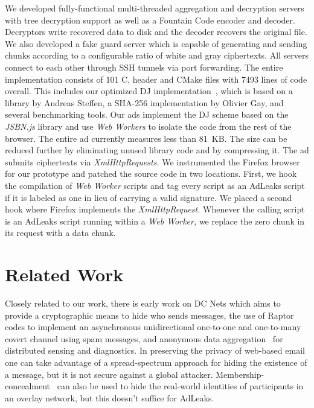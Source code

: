 \documentclass[twocolumn,10pt]{article}
\begin{document}
We developed fully-functional multi-threaded aggregation and decryption
servers with tree decryption support as well as a Fountain Code encoder and
decoder.  Decryptors write recovered data to disk and the decoder recovers
the original file.  We also developed a fake guard server which is capable
of generating and sending chunks according to a configurable ratio of white
and gray ciphertexts.  All servers connect to each other through SSH tunnels
via port forwarding.  The entire implementation consists of 101 C, header
and CMake files with 7493 lines of code overall.  This includes our
optimized DJ implementation~\cite{Jurik2003}, which is based on a library by
Andreas Steffen, a SHA-256 implementation by Olivier Gay, and several
benchmarking tools.  Our ads implement the DJ scheme based on the
\emph{JSBN.js} library and use \emph{Web Workers} to isolate the code from
the rest of the browser.  The entire ad currently measures less than 81~KB.
The size can be reduced further by eliminating unused library code and by
compressing it.  The ad submits ciphertexts via \emph{XmlHttpRequests.}  We
instrumented the Firefox browser for our prototype and patched the source
code in two locations.  First, we hook the compilation of \emph{Web Worker}
scripts and tag every script as an AdLeaks script if it is labeled as one in
lieu of carrying a valid signature.  We placed a second hook where Firefox
implements the \emph{XmlHttpRequest.}  Whenever the calling script is an
AdLeaks script running within a \emph{Web Worker,} we replace the zero chunk
in its request with a data chunk.


\section{Related Work}



Closely related to our work, there is early work on DC Nets
\cite{Chaum1988,WaidnerP1989} which aims to provide a cryptographic means to
hide who sends messages, the use of Raptor codes \cite{CastiglioneDFP2012}
to implement an asynchronous unidirectional one-to-one and one-to-many
covert channel using spam messages, and anonymous data
aggregation~\cite{PuttaswamyBP2010} for distributed sensing and
diagnostics. In preserving the privacy of web-based
email~\cite{ButlerEPTM2006} one can take advantage of a spread-spectrum
approach for hiding the existence of a message, but it is not secure against
a global attacker. Membership-concealment~\cite{VassermanJTHY2009} can also
be used to hide the real-world identities of participants in an overlay
network, but this doesn't suffice for AdLeaks.
\end{document}
